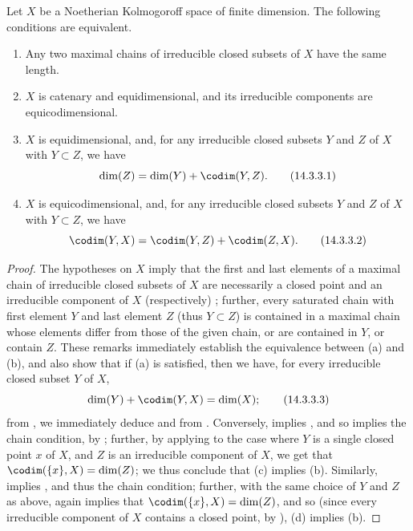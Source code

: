 \begin{proposition}[14.3.3]
\label{0.14.3.3}
Let $X$ be a Noetherian Kolmogoroff space of finite dimension.
The following conditions are equivalent.
\begin{enumerate}
  \item[{\rm(a)}] Any two maximal chains of irreducible closed subsets of $X$ have the same length.
  \item[{\rm(b)}] $X$ is catenary and equidimensional, and its irreducible components are equicodimensional.
  \item[{\rm(c)}] $X$ is equidimensional, and, for any irreducible closed subsets $Y$ and $Z$ of $X$ with $Y\subset Z$, we have
    \[
    \label{0.14.3.3.1}
      \dim(Z)=\dim(Y)+\codim(Y,Z).
      \tag{14.3.3.1}
    \]
  \item[{\rm(d)}] $X$ is equicodimensional, and, for any irreducible closed subsets $Y$ and $Z$ of $X$ with $Y\subset Z$, we have
    \[
    \label{0.14.3.3.2}
      \codim(Y,X)=\codim(Y,Z)+\codim(Z,X).
      \tag{14.3.3.2}
    \]
\end{enumerate}
\end{proposition}

\begin{proof}
The hypotheses on $X$ imply that the first and last elements of a maximal chain of irreducible closed subsets of $X$ are necessarily a closed point and an irreducible component of $X$ (respectively) ;
further, every saturated chain with first element $Y$ and last element $Z$ (thus $Y\subset Z$) is contained in a maximal chain whose elements differ from those of the given chain, or are contained in $Y$, or contain $Z$.
These remarks immediately establish the equivalence between (a) and (b), and also show that if (a) is satisfied, then we have, for every irreducible closed subset $Y$ of $X$,
\[
\label{0.14.3.3.3}
  \dim(Y)+\codim(Y,X)=\dim(X);
  \tag{14.3.3.3}
\]
from , we immediately deduce  and  from .
Conversely,  implies , and so  implies the chain condition, by ;
further, by applying  to the case where $Y$ is a single closed point $x$ of $X$, and $Z$ is an irreducible component of $X$, we get that $\codim(\{x\},X)=\dim(Z)$;
we thus conclude that (c) implies (b).
Similarly,  implies , and thus the chain condition;
further, with the same choice of $Y$ and $Z$ as above,  again implies that $\codim(\{x\},X)=\dim(Z)$, and so (since every irreducible component of $X$ contains a closed point, by ), (d) implies (b).
\end{proof}


